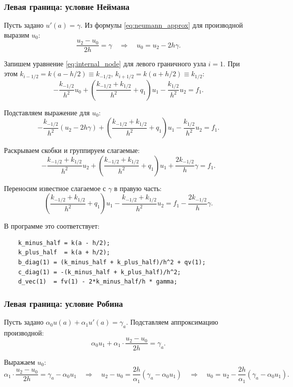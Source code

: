 \documentclass[14pt,a4paper]{extarticle}  %
\numberwithin{equation}{section}
\begin{document}
\subsubsection{Левая граница: условие Неймана}

Пусть задано \(u'(a) = \gamma\). Из формулы \eqref{eq:neumann_approx} 
для производной выразим \(u_0\):
\[
\frac{u_2 - u_0}{2h} = \gamma \quad\Rightarrow\quad u_0 = u_2 - 2h\gamma.
\]

Запишем уравнение \eqref{eq:internal_node} для левого граничного узла \(i=1\). 
При этом \(k_{i-1/2} = k(a - h/2) \equiv k_{-1/2}\), 
\(k_{i+1/2} = k(a + h/2) \equiv k_{1/2}\):
\[
-\frac{k_{-1/2}}{h^2}u_0 + 
\left( \frac{k_{-1/2}+k_{1/2}}{h^2} + q_1 \right)u_1 - 
\frac{k_{1/2}}{h^2}u_2 = f_1.
\]

Подставляем выражение для \(u_0\):
\[
-\frac{k_{-1/2}}{h^2}(u_2 - 2h\gamma) + 
\left( \frac{k_{-1/2}+k_{1/2}}{h^2} + q_1 \right)u_1 - 
\frac{k_{1/2}}{h^2}u_2 = f_1.
\]

Раскрываем скобки и группируем слагаемые:
\[
-\frac{k_{-1/2}+k_{1/2}}{h^2}u_2 + 
\left( \frac{k_{-1/2}+k_{1/2}}{h^2} + q_1 \right)u_1 + 
\frac{2k_{-1/2}}{h}\gamma = f_1.
\]

Переносим известное слагаемое с \(\gamma\) в правую часть:
\begin{equation}
    \left( \frac{k_{-1/2}+k_{1/2}}{h^2} + q_1 \right)u_1 - 
    \frac{k_{-1/2}+k_{1/2}}{h^2}u_2 = f_1 - \frac{2k_{-1/2}}{h}\gamma.
    \label{eq:left_neumann_final}
\end{equation}

В программе это соответствует:

\begin{verbatim}
    k_minus_half = k(a - h/2);
    k_plus_half  = k(a + h/2);
    b_diag(1) = (k_minus_half + k_plus_half)/h^2 + qv(1);
    c_diag(1) = -(k_minus_half + k_plus_half)/h^2;
    d_vec(1)  = fv(1) - 2*k_minus_half/h * gamma;
\end{verbatim}

\subsubsection{Левая граница: условие Робина}

Пусть задано \(\alpha_0 u(a) + \alpha_1 u'(a) = \gamma_a\). 
Подставляем аппроксимацию производной:
\[
\alpha_0 u_1 + \alpha_1 \cdot \frac{u_2 - u_0}{2h} = \gamma_a.
\]

Выражаем \(u_0\):
\[
\alpha_1 \cdot \frac{u_2 - u_0}{2h} = \gamma_a - \alpha_0 u_1
\quad\Rightarrow\quad
u_2 - u_0 = \frac{2h}{\alpha_1}(\gamma_a - \alpha_0 u_1)
\quad\Rightarrow\quad
u_0 = u_2 - \frac{2h}{\alpha_1}(\gamma_a - \alpha_0 u_1).
\]
\end{document}
